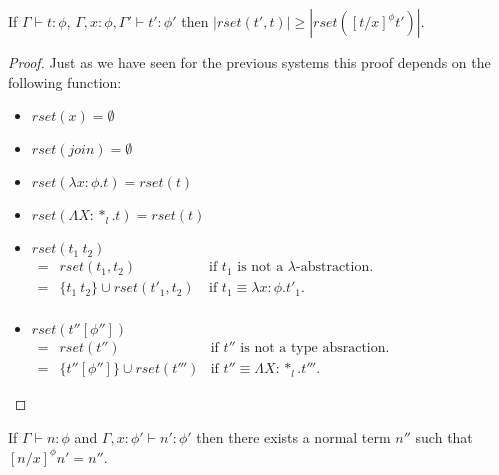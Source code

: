 \begin{lemma}
  \label{lemma:redex_preserving_ssfe}
  If $\Gamma \vdash t : \phi$, $\Gamma, x:\phi, \Gamma' \vdash t':\phi'$
  then  $|rset(t', t)| \geq |rset([t/x]^\phi t')|$.
\end{lemma}
\begin{proof}
  Just as we have seen for the previous systems this proof depends on
  the following function:
  \begin{center}
    \begin{itemize}
    \item[] $rset(x) = \emptyset$\\
    \item[] $rset(join) = \emptyset$
    \item[] $rset(\lambda x:\phi.t) = rset(t)$\\
    \item[] $rset(\Lambda X:*_l.t) = rset(t)$\\
    \item[] $rset(t_1\ t_2)$\\
      \begin{math}
        \begin{array}{lll}
          = & rset(t_1, t_2) & \text{if } t_1 \text{ is not a } \lambda \text{-abstraction.}\\
          = & \{t_1\ t_2\} \cup rset(t'_1, t_2)\ & \text{if } t_1 \equiv \lambda x:\phi.t'_1.\\
        \end{array}
      \end{math}
    \item[] $rset(t''[\phi''])$\\
      \begin{math}
        \begin{array}{lll}
          = & rset(t'') & \text{if } t'' \text{ is not a type absraction.}\\
          = & \{t''[\phi'']\} \cup rset(t''') & \text{if } t'' \equiv \Lambda X:*_l.t'''.
        \end{array}
      \end{math}
    \end{itemize}
  \end{center}  
\end{proof}

\begin{lemma}
  \label{corollary:normalization_preserving_ssfe}
  If $\Gamma \vdash n:\phi$ and $\Gamma, x:\phi' \vdash n':\phi'$ then there exists a normal term $n''$ 
  such that $[n/x]^\phi n' = n''$.
\end{lemma}

